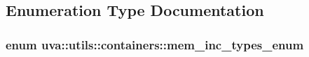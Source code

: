 \subsection{Enumeration Type Documentation}
\hypertarget{namespaceuva_1_1utils_1_1containers_a2dfd5027e0c656e7b8433760967da62d}{}
\subsubsection[{mem\+\_\+inc\+\_\+types\+\_\+enum}]{\setlength{\rightskip}{0pt plus 5cm}enum {\bf uva\+::utils\+::containers\+::mem\+\_\+inc\+\_\+types\+\_\+enum}}\label{namespaceuva_1_1utils_1_1containers_a2dfd5027e0c656e7b8433760967da62d}
